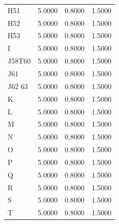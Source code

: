 \begin{tabular}{lrrr}
H51 & 5.0000 & 0.8000 & 1.5000 \\
H52 & 5.0000 & 0.8000 & 1.5000 \\
H53 & 5.0000 & 0.8000 & 1.5000 \\
I & 5.0000 & 0.8000 & 1.5000 \\
J58T60 & 5.0000 & 0.8000 & 1.5000 \\
J61 & 5.0000 & 0.8000 & 1.5000 \\
J62 63 & 5.0000 & 0.8000 & 1.5000 \\
K & 5.0000 & 0.8000 & 1.5000 \\
L & 5.0000 & 0.8000 & 1.5000 \\
M & 5.0000 & 0.8000 & 1.5000 \\
N & 5.0000 & 0.8000 & 1.5000 \\
O & 5.0000 & 0.8000 & 1.5000 \\
P & 5.0000 & 0.8000 & 1.5000 \\
Q & 5.0000 & 0.8000 & 1.5000 \\
R & 5.0000 & 0.8000 & 1.5000 \\
S & 5.0000 & 0.8000 & 1.5000 \\
T & 5.0000 & 0.8000 & 1.5000 \\
\bottomrule
\end{tabular}
